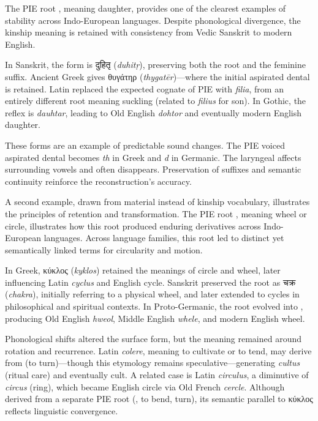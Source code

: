 The PIE root , meaning \QENOpen{}daughter,\QENClose{} provides one of the clearest examples of stability across Indo-European languages. Despite phonological divergence, the kinship meaning is retained with consistency from Vedic Sanskrit to modern English.

In Sanskrit, the form is \textsanskrit{दुहितृ} (\emph{duhitṛ}), preserving both the root and the feminine suffix. Ancient Greek gives \textgreek{θυγάτηρ} (\emph{thygatēr})—where the initial aspirated dental is retained. Latin replaced the expected cognate of PIE  with \emph{filia}, from an entirely different root meaning \QSOpen{}suckling\QSClose{} (related to \emph{filius} for \QSOpen{}son\QSClose{}). In Gothic, the reflex is \emph{dauhtar}, leading to Old English \emph{dohtor} and eventually modern English \QSOpen{}daughter.\QSClose{}

These forms are an example of predictable sound changes. The PIE voiced aspirated dental  becomes \emph{th} in Greek and \emph{d} in Germanic. The laryngeal  affects surrounding vowels and often disappears. Preservation of suffixes and semantic continuity reinforce the reconstruction's accuracy.

A second example, drawn from material instead of kinship vocabulary, illustrates the principles of retention and transformation. The PIE root , meaning \QSOpen{}wheel\QSClose{} or \QSOpen{}circle,\QSClose{} illustrates how this root produced enduring derivatives across Indo-European languages. Across language families, this root led to distinct yet semantically linked terms for circularity and motion.

In Greek, \textgreek{κύκλος} (\emph{kyklos}) retained the meanings of \QSOpen{}circle\QSClose{} and \QSOpen{}wheel,\QSClose{} later influencing Latin \emph{cyclus} and English \QSOpen{}cycle.\QSClose{} Sanskrit preserved the root as \textsanskrit{चक्र} (\emph{chakra}), initially referring to a physical wheel, and later extended to cycles in philosophical and spiritual contexts. In Proto-Germanic, the root evolved into , producing Old English \emph{hweol}, Middle English \emph{whele}, and modern English \QSOpen{}wheel.\QSClose{}

Phonological shifts altered the surface form, but the meaning remained around rotation and recurrence. Latin \emph{colere}, meaning \QSOpen{}to cultivate\QSClose{} or \QSOpen{}to tend,\QSClose{} may derive from  (\QSOpen{}to turn\QSClose{})—though this etymology remains speculative—generating \emph{cultus} (\QSOpen{}ritual care\QSClose{}) and eventually \QSOpen{}cult.\QSClose{} A related case is Latin \emph{circulus}, a diminutive of \emph{circus} (\QSOpen{}ring\QSClose{}), which became English \QSOpen{}circle\QSClose{} via Old French \emph{cercle}. Although derived from a separate PIE root (, \QSOpen{}to bend, turn\QSClose{}), its semantic parallel to \textgreek{κύκλος} reflects linguistic convergence.


